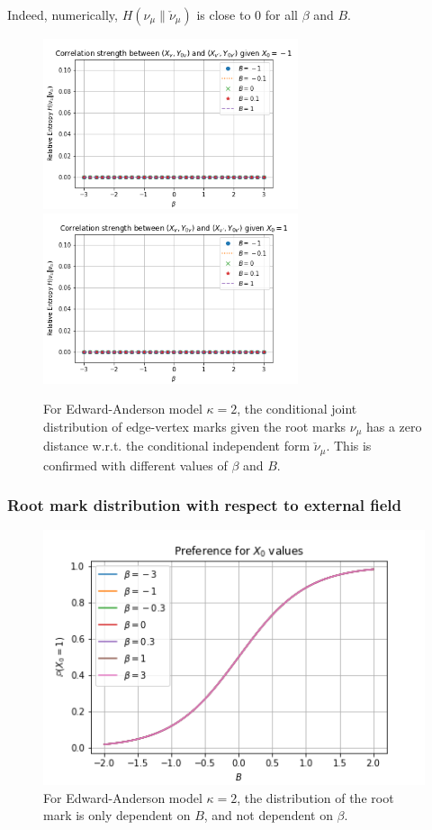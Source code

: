 \documentclass[12pt]{article}
\numberwithin{equation}{section}
\begin{document}
Indeed, numerically, $H(\nu_\mu \| \check{\nu}_\mu)$ is close to $0$ for all $\beta$ and $B$.
\begin{figure}[h]
    \centering
    \includegraphics[width=7.5cm]{img/EA_x1_x2_RelEntr_x0=-1.png}
    \includegraphics[width=7.5cm]{img/EA_x1_x2_RelEntr_x0=1.png}
    \caption{For Edward-Anderson model $\kappa=2$, the conditional joint distribution of edge-vertex marks given the root marks $\nu_\mu$
        has a zero distance w.r.t. the conditional independent form $\check{\nu}_\mu$. This is confirmed with different values of $\beta$ and $B$.}
    \label{Fig.EA-x1-x2-given-x0-rel-entr}
\end{figure}

\subsubsection{Root mark distribution with respect to external field}

\begin{figure}[h]
    \centering
    \includegraphics[width=12cm]{img/EA_x0_B.png}
    \caption{For Edward-Anderson model $\kappa=2$, the distribution of the root mark is only dependent on $B$, and not dependent on $\beta$. }
    \label{Fig.EA-x0-B}
\end{figure}
\end{document}
